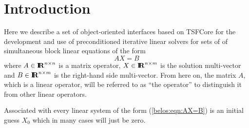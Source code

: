 \documentclass[pdf,ps2pdf,11pt]{SANDreport}
\begin{document}


%
\SANDmain %

\section{Introduction}

Here we describe a set of object-oriented interfaces based on TSFCore
{}\cite{ref:TSFCore} for the development and use of preconditioned
iterative linear solvers for sets of of simultaneous block linear
equations of the form
%
\begin{equation}
A X = B
\label{belos:eqn:AX=B}
\end{equation}
%
{}\noindent{}where $A\in\mbox{\textbf{I}}\hspace{-0.6ex}\mbox{\textbf{R}}^{n {}\times n}$ is a matrix operator,
$X\in\mbox{\textbf{I}}\hspace{-0.6ex}\mbox{\textbf{R}}^{n {}\times m}$ is the solution multi-vector and $B\in\mbox{\textbf{I}}\hspace{-0.6ex}\mbox{\textbf{R}}^{n
{}\times m}$ is the right-hand side multi-vector.  From here on, the
matrix $A$, which is a linear operator, will be referred to as ``the
operator'' to distinguish it from other linear operators.

Associated with every linear system of the form (\ref{belos:eqn:AX=B})
is an initial guess $X_0$ which in many cases will just be zero.
\end{document}
